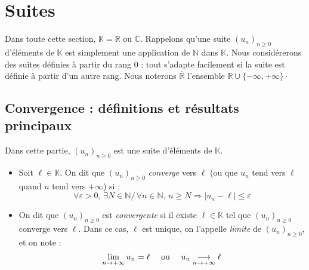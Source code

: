 \documentclass[french,11pt,twoside]{VcCours}
\begin{document}

\tableofcontents
\separationTitre

\newpage
\section{Suites}

Dans toute cette section, $\mathbb{K}= \mathbb{R}$ ou $\mathbb{C}$. Rappelons qu'une suite $(u_n)_{n \geq 0}$ d'éléments de $\mathbb{K}$ est simplement une application de $\mathbb{N}$ dans $\mathbb{K}$. Nous considérerons des suites définies à partir du rang $0$ : tout s'adapte facilement si la suite est définie à partir d'un autre rang. Nous noterons $\overline{\mathbb{R}}$ l'ensemble $\mathbb{R} \cup \lbrace - \infty, + \infty \rbrace\cdot$

\subsection{Convergence : définitions et résultats principaux}

Dans cette partie, $(u_n)_{ n \geq 0}$ est une suite d'éléments de $\mathbb{K}$.

\begin{TheoremeDefinition}{} 
\begin{itemize}
\item Soit $\ell \in \mathbb{K}$. On dit que $(u_n)_{n \geq 0}$ \emph{converge}
vers $\ell$ (ou que $u_n$ tend vers $\ell$ quand $n$ tend vers $+ \infty$) si :
$$ \forall \varepsilon>0, \, \exists N \in \mathbb{N}/ \, \forall n \in \mathbb{N},
\, n \geq N \Rightarrow \vert u_n - \ell \vert \leq \varepsilon$$ 
\item On dit que $(u_n)_{n \geq 0}$ est \emph{convergente} si il existe 
$\ell \in \mathbb{K}$ tel que $(u_n)_{n \geq 0}$ converge vers $\ell$. 
Dans ce cas, $\ell$ est unique, on l'appelle \emph{limite} de $(u_n)_{n \geq 0}$, 
et on note :
$$ \lim_{ n \rightarrow + \infty} u_n = \ell \quad \hbox{ ou } \quad u_n 
\underset{n \rightarrow + \infty}{\longrightarrow} \ell$$
\end{itemize}
\end{TheoremeDefinition}{}
\end{document}

